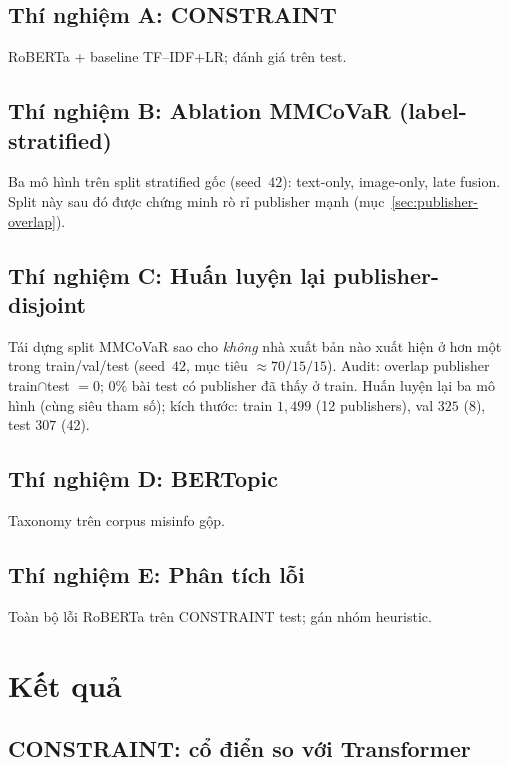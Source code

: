 \documentclass[12pt, a4paper]{report}
\begin{document}
\subsection{Thí nghiệm A: CONSTRAINT}

RoBERTa + baseline TF--IDF+LR; đánh giá trên test.

\subsection{Thí nghiệm B: Ablation MMCoVaR (label-stratified)}

Ba mô hình trên split stratified gốc (seed~$42$): text-only, image-only, late fusion.
Split này sau đó được chứng minh rò rỉ publisher mạnh (mục~\ref{sec:publisher-overlap}).

\subsection{Thí nghiệm C: Huấn luyện lại publisher-disjoint}

Tái dựng split MMCoVaR sao cho \emph{không} nhà xuất bản nào xuất hiện ở hơn một trong train/val/test (seed~$42$, mục tiêu $\approx 70/15/15$).
Audit: overlap publisher train$\cap$test $=0$; $0\%$ bài test có publisher đã thấy ở train.
Huấn luyện lại ba mô hình (cùng siêu tham số); kích thước: train $1{,}499$ (12 publishers), val $325$ (8), test $307$ (42).

\subsection{Thí nghiệm D: BERTopic}

Taxonomy trên corpus misinfo gộp.

\subsection{Thí nghiệm E: Phân tích lỗi}

Toàn bộ lỗi RoBERTa trên CONSTRAINT test; gán nhóm heuristic.

\section{Kết quả}
\label{sec:results}

\subsection{CONSTRAINT: cổ điển so với Transformer}
\end{document}
